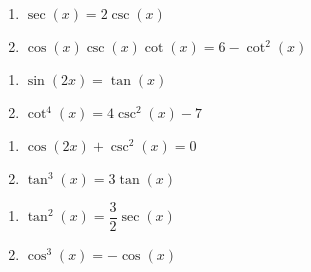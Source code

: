 \begin{multicols}{2}

\begin{enumerate}

\setcounter{enumi}{\value{HW}}

\item  $\sec(x) = 2\csc(x)$
\item  $\cos(x)\csc(x)\cot(x) = 6-\cot^{2}(x)$

\setcounter{HW}{\value{enumi}}

\end{enumerate}

\end{multicols}

\begin{multicols}{2}

\begin{enumerate}

\setcounter{enumi}{\value{HW}}

\item  $\sin(2x) = \tan(x)$
\item  $\cot^{4}(x) = 4\csc^{2}(x) - 7$

\setcounter{HW}{\value{enumi}}

\end{enumerate}

\end{multicols}

\begin{multicols}{2}

\begin{enumerate}

\setcounter{enumi}{\value{HW}}

\item  $\cos(2x) + \csc^{2}(x) = 0$
\item $\tan^{3} \left( x \right) = 3\tan \left( x \right)$

\setcounter{HW}{\value{enumi}}

\end{enumerate}

\end{multicols}

\begin{multicols}{2}

\begin{enumerate}

\setcounter{enumi}{\value{HW}}

\item $\tan^{2} \left( x \right) = \dfrac{3}{2} \sec \left( x \right)$
\item $\cos^{3} \left( x \right) = -\cos \left( x \right)$ 

\setcounter{HW}{\value{enumi}}

\end{enumerate}

\end{multicols}

